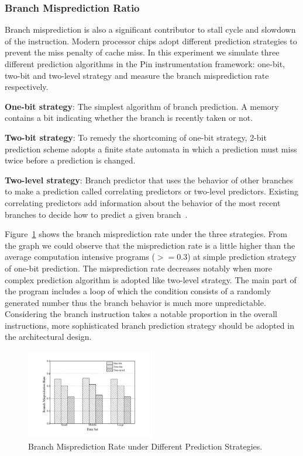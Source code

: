 \subsubsection{Branch Misprediction Ratio }
Branch misprediction is also a significant contributor to stall cycle and slowdown of the instruction. Modern processor chips adopt different prediction strategies to prevent the miss penalty of cache miss. In this experiment we simulate three different prediction algorithms in the Pin instrumentation framework: one-bit, two-bit and two-level strategy and measure the branch misprediction rate respectively.

\begin{compactitem}
\item \textbf{One-bit strategy}: The simplest algorithm of branch prediction. A memory contains a bit indicating whether the branch is recently taken or not.
\item \textbf{Two-bit strategy}: To remedy the shortcoming of one-bit strategy, 2-bit prediction scheme adopts a finite state automata in which a prediction must miss twice before a prediction is changed.
\item \textbf{Two-level strategy}: Branch predictor that uses the behavior of other branches to make a prediction called correlating predictors or two-level predictors. Existing correlating predictors add information about the behavior of the most recent branches to decide how to predict a given branch~\cite{John:2006,Ribas:2006}.
\end{compactitem}
Figure~\ref{fig:predict} shows the branch misprediction rate under the three strategies. From the graph we could observe that the misprediction rate is a little higher than the average computation intensive programs ($>=0.3$) at simple prediction strategy of one-bit prediction. The misprediction rate decreases notably when more complex prediction algorithm is adopted like two-level strategy. The main part of the program includes a loop of which the condition consists of a randomly generated number thus the branch behavior is much more unpredictable. Considering the branch instruction takes a notable proportion in the overall instructions, more sophisticated branch prediction strategy should be adopted in the architectural design.

\begin{figure}[ht]
\centering
\includegraphics[width=0.50\textwidth]{graph/predict.pdf}
\caption{Branch Misprediction Rate under Different Prediction Strategies.}
\label{fig:predict}
\end{figure}

